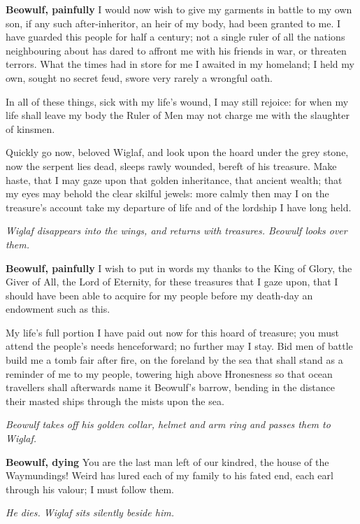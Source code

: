 \documentclass[a4paper]{article}
\begin{document}
{\linewise

\textbf{Beowulf, painfully} I would now wish to give my garments in battle
to my own son, if any such
after-inheritor, an heir of my body,
had been granted to me. I have guarded this people 
for half a century; not a single ruler
of all the nations neighbouring about
has dared to affront me with his friends in war,
or threaten terrors. What the times had in store for me
I awaited in my homeland; I held my own,
sought no secret feud, swore very rarely
a wrongful oath.

In all of these things,
sick with my life’s wound, I may still rejoice:
for when my life shall leave my body
the Ruler of Men may not charge me
with the slaughter of kinsmen.

 Quickly go now,
beloved Wiglaf, and look upon the hoard
under the grey stone, now the serpent lies dead,
sleeps rawly wounded, bereft of his treasure.
Make haste, that I may gaze upon that golden inheritance,
that ancient wealth; that my eyes may behold
the clear skilful jewels: more calmly then may I
on the treasure’s account take my departure
of life and of the lordship I have long held.

}

\centerline{\textit{Wiglaf disappears into the wings, and returns with treasures. Beowulf looks over them.}}

{\linewise

\textbf{Beowulf, painfully} I wish to put in words my thanks
to the King of Glory, the Giver of All,
the Lord of Eternity, for these treasures that I gaze upon,
that I should have been able to acquire for my people
before my death-day an endowment such as this.

My life’s full portion I have paid out now
for this hoard of treasure; you must attend the people’s
needs henceforward; no further may I stay.
Bid men of battle build me a tomb
fair after fire, on the foreland by the sea
that shall stand as a reminder of me to my people,
towering high above Hronesness
so that ocean travellers shall afterwards name it
Beowulf’s barrow, bending in the distance
their masted ships through the mists upon the sea.

}

\centerline{\textit{Beowulf takes off his golden collar, helmet and arm ring and passes them to Wiglaf.}}

{\linewise

\textbf{Beowulf, dying} You are the last man left of our kindred,
the house of the Waymundings! Weird has lured
each of my family to his fated end,
each earl through his valour; I must follow them.

}

\centerline{\textit{He dies. Wiglaf sits silently beside him.}}
\end{document}
